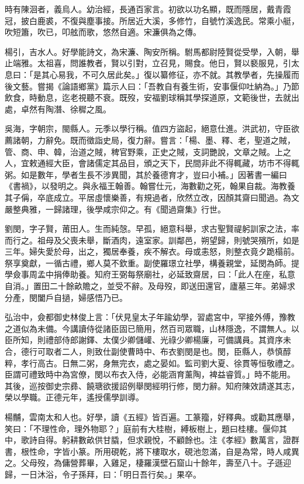 \begin{pinyinscope}
時有陳洄者，義烏人。幼治經，長通百家言。初欲以功名顯，既而隱居，戴青霞冠，披白鹿裘，不復與塵事接。所居近大溪，多修竹，自號竹溪逸民。常乘小艇，吹短簫，吹已，叩舷而歌，悠然自適。宋濂俱為之傳。

楊引，吉水人。好學能詩文，為宋濂、陶安所稱。駙馬都尉陸賢從受學，入朝，舉止端雅。太祖喜，問誰教者，賢以引對，立召見，賜食。他日，賢以褻服見，引太息曰：「是其心易我，不可久居此矣。」復以纂修征，亦不就。其教學者，先操履而後文藝。嘗揭《論語鄉黨》篇示人曰：「吾教自有養生術，安事偃仰吐納為。」乃節飲食，時動息，迄老視聽不衰。既歿，安福劉球稱其學探道原，文範後世，去就出處，卓然有陶潛、徐穉之風。

吳海，字朝宗，閩縣人。元季以學行稱。值四方盜起，絕意仕進。洪武初，守臣欲薦諸朝，力辭免。既而徵詣史局，復力辭。嘗言：「楊、墨、釋、老，聖道之賊，管、商、申、韓，治道之賊，稗官野乘，正史之賊，支詞艷說，文章之賊。上之人，宜敕通經大臣，會諸儒定其品目，頒之天下，民間非此不得輒藏，坊市不得輒粥。如是數年，學者生長不涉異聞，其於養德育才，豈曰小補。」因著書一編曰《書禍》，以發明之。與永福王翰善。翰嘗仕元，海數勸之死，翰果自裁。海教養其子偁，卒底成立。平居虛懷樂善，有規過者，欣然立改，因顏其齋曰聞過。為文嚴整典雅，一歸諸理，後學咸宗仰之。有《聞過齋集》行世。

劉閔，字子賢，莆田人。生而純愨。早孤，絕意科舉，求古聖賢禔躬訓家之法，率而行之。祖母及父喪未舉，斷酒肉，遠室家。訓鄰邑，朔望歸，則號哭殯所，如是三年。婦失愛於母，出之，獨居奉養，疾不解衣。母或恚怒，則整衣竟夕跪榻前。祭享奠獻，一循古禮，鄉人莫不欽重。副使羅璟立社學，構養親堂，延閔為師。提學僉事周孟中捐俸助養。知府王弼每祭廟社，必延致齋居，曰：「此人在座，私意自消。」置田二十餘畝贍之，並受不辭。及母歿，即送田還官，廬墓三年。弟婦求分產，閔闔戶自撾，婦感悟乃已。

弘治中，僉都御史林俊上言：「伏見皇太子年踰幼學，習處宮中，罕接外傅，豫教之道似為未備。今講讀侍從諸臣固已簡用，然百司眾職，山林隱逸，不謂無人。以臣所知，則禮部侍郎謝鐸、太僕少卿儲巏、光祿少卿楊廉，可備講員。其資序未合，德行可取者二人，則致仕副使曹時中、布衣劉閔是也。閔，臣縣人，恭慎醇粹，孝行高古。日無二粥，身無完衣，處之晏如。監司劉大夏、徐貫等恒敬禮之。臣謂可禮致時中為宮僚，閔以布衣入侍，必能涵育薰陶，裨益睿質。」時不能用。其後，巡按御史宗彞、饒瑭欲援詔例舉閔經明行修，閔力辭。知府陳效請遂其志，榮以學職。正德元年，遙授儒學訓導。

楊黼，雲南太和人也。好學，讀《五經》皆百遍。工篆籀，好釋典。或勸其應舉，笑曰：「不理性命，理外物耶？」庭前有大桂樹，縛板樹上，題曰桂樓。偃仰其中，歌詩自得。躬耕數畝供甘膬，但求親悅，不顧餘也。注《孝經》數萬言，證群書，根性命，字皆小篆。所用硯乾，將下樓取水，硯池忽滿，自是為常，時人咸異之。父母歿，為傭營葬畢，入雞足，棲羅漢壁石窟山十餘年，壽至八十。子遜迎歸，一日沐浴，令子孫拜，曰：「明日吾行矣。」果卒。


\end{pinyinscope}
